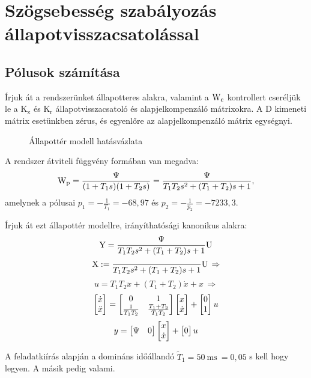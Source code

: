 \section{Szögsebesség szabályozás állapotvisszacsatolással}

\subsection{Pólusok számítása}

Írjuk át a rendszerünket állapotteres alakra, valamint a $\mathrm{W}_\text{c}$ kontrollert
cseréljük le a $\mathrm{K}_\text{x}$ és $\mathrm{K}_\text{r}$ állapotvisszacsatoló és
alapjelkompenzáló mátrixokra.
A $\mathrm{D}$ kimeneti mátrix esetünkben zérus, és egyenlőre az
alapjelkompenzáló mátrix egységnyi.

\begin{figure}[H]
    \centering
    \caption{Állapottér modell hatásvázlata}
    \label{fig:5a_allapotter_hatasvazlat}
\end{figure}

A rendszer átviteli függvény formában van megadva:
\begin{equation}
	\mathrm{W}_\text{p} = \frac{\Psi}{(1+T_1s)(1+T_2s)} = \frac{\Psi}{T_1T_2s^2+(T_1+T_2)s+1},
\end{equation}
amelynek a pólusai $p_1=-\frac{1}{T_1} = -68,97$ és $p_2=-\frac{1}{p_2} = -7233,3$.

Írjuk át ezt állapottér modellre, irányíthatósági kanonikus alakra:
\begin{equation}
	\mathrm{Y} = \frac{\Psi}{T_1T_2s^2+(T_1+T_2)s+1}\mathrm{U}
\end{equation}
\begin{equation}
	\mathrm{X} := \frac{}{T_1T_2s^2+(T_1+T_2)s+1}\mathrm{U}\,\Rightarrow
\end{equation}
\begin{equation}
	u = T_1T_2\ddot{x} + (T_1+T_2)\dot{x} + x\,\Rightarrow
\end{equation}
\begin{equation}
	\begin{bmatrix}\dot{x}\\\ddot{x}\end{bmatrix} = \begin{bmatrix}0&1\\\frac{1}{T_1T_2}&\frac{T_1+T_2}{T_1T_2}\end{bmatrix}\begin{bmatrix}x\\\dot{x}\end{bmatrix}
	+ \begin{bmatrix}0\\1\end{bmatrix}u
\end{equation}
\begin{equation}
	y = \begin{bmatrix}\Psi&0\end{bmatrix}\begin{bmatrix}x\\\dot{x}\end{bmatrix} + \begin{bmatrix}0\end{bmatrix}u
\end{equation}

A feladatkiírás alapján a domináns időállandó $\widetilde{T}_1=50~\text{ms}~=0,05$ s
kell hogy legyen. A másik pedig valami.%


